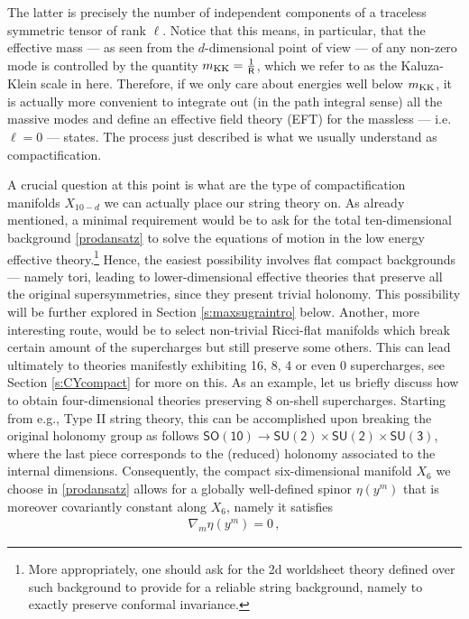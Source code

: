 %
The latter is precisely the number of independent components of a traceless symmetric tensor of rank $\ell$. Notice that this means, in particular, that the effective mass --- as seen from the $d$-dimensional point of view --- of any non-zero mode is controlled by the quantity $m_{\rm KK} = \frac{1}{\mathsf{R}}$, which we refer to as the Kaluza-Klein scale in here. Therefore, if we only care about energies well below $m_{\rm KK}$, it is actually more convenient to integrate out (in the path integral sense) all the massive modes and define an effective field theory (EFT) for the massless --- i.e. $\ell=0$ --- states. The process just described is what we usually understand as compactification.

A crucial question at this point is what are the type of compactification manifolds $X_{10-d}$ we can actually place our string theory on. As already mentioned, a minimal requirement would be to ask for the total ten-dimensional background \eqref{prodansatz} to solve the equations of motion in the low energy effective theory.\footnote{More appropriately, one should ask for the 2d worldsheet theory defined over such background to provide for a reliable string background, namely to exactly preserve conformal invariance.} Hence, the easiest possibility involves flat compact backgrounds --- namely tori, leading to lower-dimensional effective  theories that preserve all the original supersymmetries, since they present trivial holonomy. This possibility will be further explored in Section \ref{s:maxsugraintro} below. Another, more interesting route, would be to select non-trivial Ricci-flat manifolds which break certain amount of the supercharges but still preserve some others. This can lead ultimately to theories manifestly exhibiting 16, 8, 4 or even 0 supercharges, see Section \ref{s:CYcompact} for more on this. As an example, let us briefly discuss how to obtain four-dimensional theories preserving 8 on-shell supercharges. Starting from e.g., Type II string theory, this can be accomplished upon breaking the original holonomy group as follows $\mathsf{SO(10)} \rightarrow \mathsf{SU(2)}\times \mathsf{SU(2)} \times  \mathsf{SU(3)}$, where the last piece corresponds to the (reduced) holonomy associated to the internal dimensions. Consequently, the compact six-dimensional manifold $X_6$ we choose in \eqref{prodansatz} allows for a globally well-defined spinor $\eta(y^m)$ that is moreover covariantly constant along $X_6$, namely it satisfies
%
\begin{align}\label{eq:covariantspinor}
	\nabla_m \eta(y^m) = 0\, , 
\end{align}
